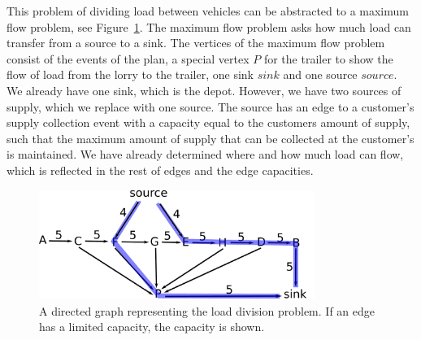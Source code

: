 This problem of dividing load between vehicles can be abstracted to a maximum flow problem, see  Figure~\ref{fig:flow_abstract}.
The maximum flow problem asks how much load can transfer from a source to a sink.
The vertices of the maximum flow problem consist of the events of the plan, a special vertex $P$ for the trailer to show the flow of load from the lorry to the trailer,
one sink $sink$ and one source $source$.
We already have one sink, which is the depot.
However, we have two sources of supply, which we replace with one source.
The source has an edge to a customer's supply collection event with a capacity equal to the customers amount of supply, such that the maximum amount of supply that can be collected at the customer's is maintained.
We have already determined where and how much load can flow, which is reflected in the rest of edges and the edge capacities. \\





\begin{figure}[!h]
  \centering
    \includegraphics[width=0.8\textwidth]{img/trivial_flow_abstract_BlueFlow_v2.pdf}
  \caption{A directed graph representing the load division problem. If an edge has a limited capacity, the capacity is shown.}
  \label{fig:flow_abstract}
\end{figure}

%


